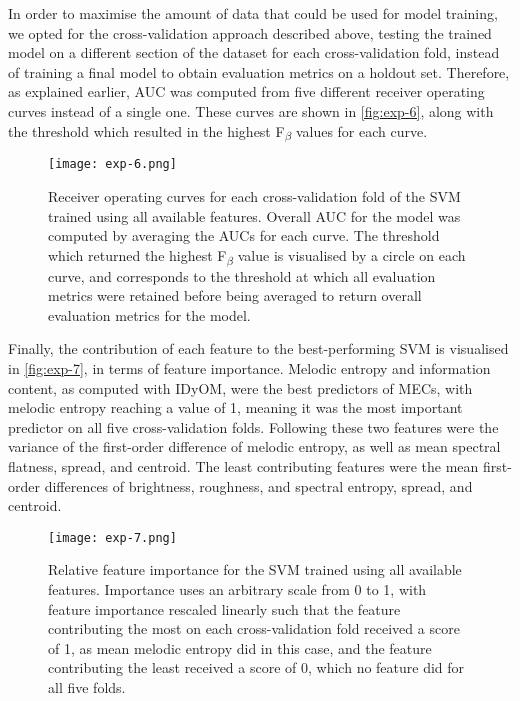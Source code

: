 

In order to maximise the amount of data that could be used for model training, we opted for the cross-validation approach described above, testing the trained model on a different section of the dataset for each cross-validation fold, instead of training a final model to obtain evaluation metrics on a holdout set. Therefore, as explained earlier, AUC was computed from five different receiver operating curves instead of a single one. These curves are shown in \autoref{fig:exp-6}, along with the threshold which resulted in the highest F\textsubscript{$\beta$} values for each curve.

\begin{figure}[t!]
\texttt{[image: exp-6.png]}
\centering
\caption{Receiver operating curves for each cross-validation fold of the SVM trained using all available features. Overall AUC for the model was computed by averaging the AUCs for each curve. The threshold which returned the highest F\textsubscript{$\beta$} value is visualised by a circle on each curve, and corresponds to the threshold at which all evaluation metrics were retained before being averaged to return overall evaluation metrics for the model.}
\label{fig:exp-6}
\end{figure}

Finally, the contribution of each feature to the best-performing SVM is visualised in \autoref{fig:exp-7}, in terms of feature importance. Melodic entropy and information content, as computed with IDyOM, were the best predictors of MECs, with melodic entropy reaching a value of 1, meaning it was the most important predictor on all five cross-validation folds. Following these two features were the variance of the first-order difference of melodic entropy, as well as mean spectral flatness, spread, and centroid. The least contributing features were the mean first-order differences of brightness, roughness, and spectral entropy, spread, and centroid.

\begin{figure}[t!]
\texttt{[image: exp-7.png]}
\centering
\caption{Relative feature importance for the SVM trained using all available features. Importance uses an arbitrary scale from 0 to 1, with feature importance rescaled linearly such that the feature contributing the most on each cross-validation fold received a score of 1, as mean melodic entropy did in this case, and the feature contributing the least received a score of 0, which no feature did for all five folds.}
\label{fig:exp-7}
\end{figure}

